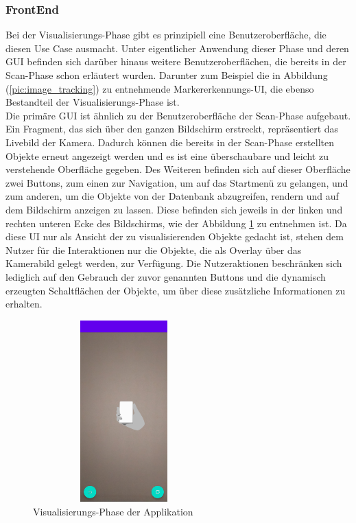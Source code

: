 \subsubsection{FrontEnd}
Bei der Visualisierungs-Phase gibt es prinzipiell eine Benutzeroberfläche, die diesen Use Case ausmacht. Unter eigentlicher Anwendung dieser Phase und 
deren \acs{GUI} befinden sich darüber hinaus weitere Benutzeroberflächen, die bereits in der Scan-Phase schon erläutert wurden. Darunter zum Beispiel 
die in Abbildung (\ref{pic:image_tracking}) zu entnehmende Markererkennungs-\acs{UI}, die ebenso Bestandteil der Visualisierungs-Phase ist. 
\\ 
Die primäre \acs{GUI} ist ähnlich zu der Benutzeroberfläche der Scan-Phase aufgebaut. 
Ein Fragment, das sich über den ganzen Bildschirm erstreckt, repräsentiert das Livebild der Kamera. Dadurch können die bereits in der Scan-Phase erstellten 
Objekte erneut angezeigt werden und es ist eine überschaubare und leicht zu verstehende Oberfläche gegeben. Des Weiteren befinden 
sich auf dieser Oberfläche zwei Buttons, zum einen zur Navigation, um auf das Startmenü zu gelangen, und zum anderen, um die Objekte von der Datenbank 
abzugreifen, rendern und auf dem Bildschirm anzeigen zu lassen. Diese befinden sich jeweils in der linken und rechten unteren Ecke des Bildschirms, wie 
der Abbildung \ref{pic:visual} zu entnehmen ist. 
Da diese \acs{UI} nur als Ansicht der zu visualisierenden Objekte gedacht ist, stehen dem Nutzer für die Interaktionen nur die Objekte, die als Overlay 
über das Kamerabild gelegt werden, zur Verfügung. Die Nutzeraktionen beschränken sich lediglich auf den Gebrauch der zuvor genannten Buttons und die dynamisch erzeugten 
Schaltflächen der Objekte, um über diese zusätzliche Informationen zu erhalten. 
\begin{figure}[hbt!]
    \centering
    \includegraphics[width=7cm,height=7cm,keepaspectratio]{4Umsetzung/Bilder/visual-phase.jpg}
    \caption{Visualisierungs-Phase der Applikation}
    \label{pic:visual}
\end{figure} 
